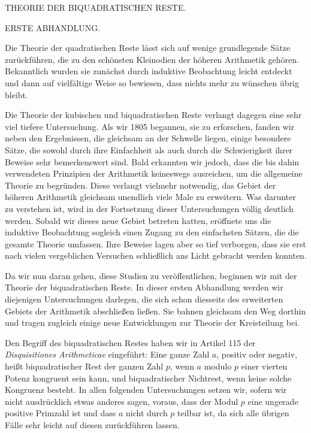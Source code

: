 %
\begin{center}
{\large THEORIE DER BIQUADRATISCHEN RESTE.\par}
\bigskip ERSTE ABHANDLUNG.
\end{center}
\BookRule{28mm}

Die Theorie der quadratischen Reste lässt sich auf wenige grundlegende Sätze zurückführen, die zu den schönsten Kleinodien der höheren Arithmetik gehören. Bekanntlich wurden sie zunächst durch induktive Beobachtung leicht entdeckt und dann auf vielfältige Weise so bewiesen, dass nichts mehr zu wünschen übrig bleibt.

Die Theorie der kubischen und biquadratischen Reste verlangt dagegen eine sehr viel tiefere Untersuchung. Als wir 1805 begannen, sie zu erforschen, fanden wir neben den Ergebnissen, die gleichsam an der Schwelle liegen, einige besondere Sätze, die sowohl durch ihre Einfachheit als auch durch die Schwierigkeit ihrer Beweise sehr bemerkenswert sind. Bald erkannten wir jedoch, dass die bis dahin verwendeten Prinzipien der Arithmetik keineswegs ausreichen, um die allgemeine Theorie zu begründen. Diese verlangt vielmehr notwendig, das Gebiet der höheren Arithmetik gleichsam unendlich viele Male zu erweitern. Was darunter zu verstehen ist, wird in der Fortsetzung dieser Untersuchungen völlig deutlich werden. Sobald wir dieses neue Gebiet betreten hatten, eröffnete uns die induktive Beobachtung sogleich einen Zugang zu den einfachsten Sätzen, die die gesamte Theorie umfassen. Ihre Beweise lagen aber so tief verborgen, dass sie erst nach vielen vergeblichen Versuchen schließlich ans Licht gebracht werden konnten.

Da wir nun daran gehen, diese Studien zu veröffentlichen, beginnen wir mit der Theorie der biquadratischen Reste. In dieser ersten Abhandlung\space{}%
 werden wir diejenigen Untersuchungen darlegen, die sich schon diesseits des erweiterten Gebiets der Arithmetik abschließen ließen. Sie bahnen gleichsam den Weg dorthin und tragen zugleich einige neue Entwicklungen zur Theorie der Kreisteilung bei.

Den Begriff des biquadratischen Restes haben wir in Artikel 115 der \emph{Disquisitiones Arithmeticae} eingeführt: Eine ganze Zahl $a$, positiv oder negativ, heißt biquadratischer Rest der ganzen Zahl $p$, wenn $a$ modulo $p$ einer vierten Potenz kongruent sein kann, und biquadratischer Nichtrest, wenn keine solche Kongruenz besteht. In allen folgenden Untersuchungen setzen wir, sofern wir nicht ausdrücklich etwas anderes sagen, voraus, dass der Modul $p$ eine ungerade positive Primzahl ist und dass $a$ nicht durch $p$ teilbar ist, da sich alle übrigen Fälle sehr leicht auf diesen zurückführen lassen.


